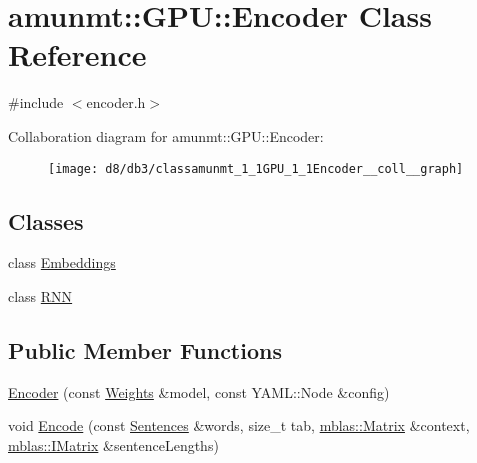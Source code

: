 \hypertarget{classamunmt_1_1GPU_1_1Encoder}{}\section{amunmt\+:\+:G\+PU\+:\+:Encoder Class Reference}
\label{classamunmt_1_1GPU_1_1Encoder}


{\ttfamily \#include $<$encoder.\+h$>$}



Collaboration diagram for amunmt\+:\+:G\+PU\+:\+:Encoder\+:
\nopagebreak
\begin{figure}[H]
\begin{center}
\leavevmode
\texttt{[image: d8/db3/classamunmt\_1\_1GPU\_1\_1Encoder\_\_coll\_\_graph]}
\end{center}
\end{figure}
\subsection*{Classes}
\begin{DoxyCompactItemize}
\item 
class \hyperlink{classamunmt_1_1GPU_1_1Encoder_1_1Embeddings}{Embeddings}
\item 
class \hyperlink{classamunmt_1_1GPU_1_1Encoder_1_1RNN}{R\+NN}
\end{DoxyCompactItemize}
\subsection*{Public Member Functions}
\begin{DoxyCompactItemize}
\item 
\hyperlink{classamunmt_1_1GPU_1_1Encoder_ae57279e908b3e254c30838cda0901edc}{Encoder} (const \hyperlink{structamunmt_1_1GPU_1_1Weights}{Weights} \&model, const Y\+A\+M\+L\+::\+Node \&config)
\item 
void \hyperlink{classamunmt_1_1GPU_1_1Encoder_a0d2c13c77b678ab60a137572ba6f6494}{Encode} (const \hyperlink{classamunmt_1_1Sentences}{Sentences} \&words, size\+\_\+t tab, \hyperlink{namespaceamunmt_1_1GPU_1_1mblas_ab67821a8254de53e45a623cf73c0aef6}{mblas\+::\+Matrix} \&context, \hyperlink{namespaceamunmt_1_1GPU_1_1mblas_ad6a337d269d1833a6028b8871e57d2d0}{mblas\+::\+I\+Matrix} \&sentence\+Lengths)
\end{DoxyCompactItemize}
